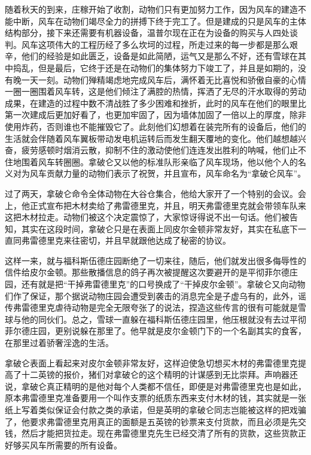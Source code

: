 随着秋天的到来，庄稼开始了收割，动物们只有更加努力工作，因为风车的建造不能中断，风车在动物们竭尽全力的拼搏下终于完工了。但是建成的只是风车的主体结构部分，接下来还需要有机器设备，温普尔现在正在为设备的购买与人四处谈判。风车这项伟大的工程历经了多么坎坷的过程，所走过来的每一步都是那么艰辛，他们的经验是如此匮乏，设备是如此简陋，运气又是那么不好，还有雪球在其中捣乱，但是最后，它终于还是在动物们的集体努力下竣工了，并且是如期的，没有晚一天一刻。动物们殚精竭虑地完成风车后，满怀着无比喜悦和骄傲自豪的心情一圈一圈围着风车转，这是他们倾注了满腔的热情，挥洒了无尽的汗水取得的劳动成果，在建造的过程中数不清战胜了多少困难和挫折，此时的风车在他们的眼里比第一次建成后更加好看了，也更加牢固了，因为墙体加固了一倍以上的厚度，除非使用炸药，否则谁也不能摧毁它了。此刻他们幻想着在装完所有的设备后，他们的生活就会伴随着风车翼板带动发电机运转后而发生翻天覆地的变化。他们越想越兴奋，疲劳感顿时烟消云散，抑制不住的激动使他们连连发出胜利的呐喊，他们止不住地围着风车转圈圈。拿破仑又以他的标准队形亲临了风车现场，他以他个人的名义对为风车贡献力量的动物们表示了祝贺，并且宣布，风车命名为“拿破仑风车”。

过了两天，拿破仑命令全体动物在大谷仓集合，他给大家开了一个特别的会议。会上，他正式宣布把木材卖给了弗雷德里克，并且，明天弗雷德里克就会带领车队来这把木材拉走。动物们被这个决定震惊了，大家惊讶得说不出一句话。他们被告知，其实在这段时间，拿破仑只是在表面上同皮尔金顿非常友好，其实在私底下一直同弗雷德里克来往密切，并且早就跟他达成了秘密的协议。

这样一来，就与福科斯伍德庄园断绝了一切来往，随后，他们就发出很多侮辱性的信件给皮尔金顿。那些散播信息的鸽子再次被提醒这次要避开的是平彻菲尔德庄园，还有就是把“干掉弗雷德里克”的口号换成了“干掉皮尔金顿”。拿破仑又向动物们作了保证，那个据说动物庄园会遭受到袭击的消息完全是子虚乌有的，此外，谣传弗雷德里克虐待动物是完全无限夸张了的说法，捏造这些传言的很有可能就是雪球与他的同伙们。总之，雪球一直躲在福科斯伍德庄园里，他压根就没有去过平彻菲尔德庄园，更别说躲在那里了。他早就是皮尔金顿门下的一个名副其实的食客，在那里过着骄奢淫逸的生活。

拿破仑表面上看起来对皮尔金顿非常友好，这样迫使急切想买木材的弗雷德里克提高了十二英镑的报价，猪们对拿破仑的这个精明的计谋感到无比崇拜。声响器还说，拿破仑真正精明的是他对每个人类都不信任，即便是对弗雷德里克也是如此，原本弗雷德里克准备要用一个叫作支票的纸质东西来支付木材的钱，其实就是一张纸上写着类似保证会付款之类的承诺，但是英明的拿破仑同志岂能被这样的把戏骗了，他要求弗雷德里克用真正的面额是五英镑的钞票来支付货款，而且必须是先交钱，然后才能把货拉走。现在弗雷德里克先生已经交清了所有的货款，这些货款正好够买风车所需要的所有设备。

